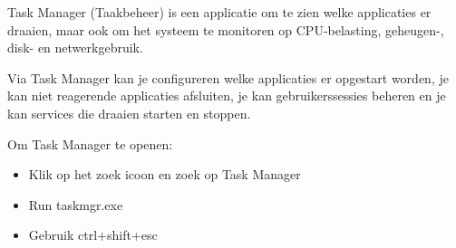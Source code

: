 Task Manager (Taakbeheer) is een applicatie om te zien welke applicaties er draaien, maar ook om het systeem te monitoren op CPU-belasting, geheugen-, disk- en netwerkgebruik.

Via Task Manager kan je configureren welke applicaties er opgestart worden, je kan niet reagerende applicaties afsluiten, je kan gebruikerssessies beheren en je kan services die draaien starten en stoppen.

Om Task Manager te openen:
\begin{itemize}
\item Klik op het zoek icoon en zoek op Task Manager
\item Run taskmgr.exe
\item Gebruik ctrl+shift+esc
\end{itemize}

\begin{minipage}[t]{\linewidth}
\raggedright
{}
\end{minipage}

